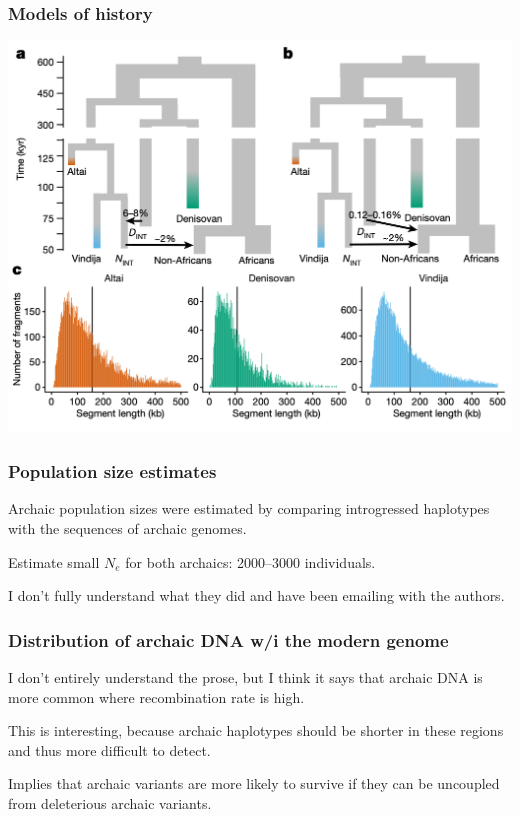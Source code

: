 \documentclass[pdftex,12pt]{beamer}
\begin{document}
\begin{frame}
  \frametitle{Models of history}
  \centering
  \includegraphics[width=\linewidth]{networks}\\
\end{frame}  

\begin{frame}
  \frametitle{Population size estimates}

  Archaic population sizes were estimated by comparing introgressed
  haplotypes with the sequences of archaic genomes.

  \bigskip

  Estimate small $N_e$ for both archaics: 2000--3000 individuals.

  \bigskip

  I don't fully understand what they did and have been emailing with
  the authors.

\end{frame}

\begin{frame}
  \frametitle{Distribution of archaic DNA w/i the modern genome}

  I don't entirely understand the prose, but I think it says that
  archaic DNA is more common where recombination rate is high.

  \bigskip

  This is interesting, because archaic haplotypes should be shorter in
  these regions and thus more difficult to detect.

  \bigskip

  Implies that archaic variants are more likely to survive if they can
  be uncoupled from deleterious archaic variants.
\end{frame}
\end{document}
